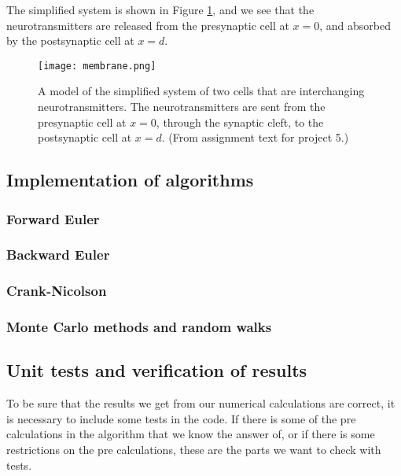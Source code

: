 \documentclass[12pt]{article}
\begin{document}
\begin{flushleft}
The simplified system is shown in Figure \ref{fig:cleft_model}, and we see that the neurotransmitters are released from the presynaptic cell at $x=0$, and absorbed by the postsynaptic cell at $x = d$.

\begin{figure}[!h]
\begin{center}
\texttt{[image: membrane.png]}
\caption{\label{fig:cleft_model}A model of the simplified system of two cells that are interchanging neurotransmitters. The neurotransmitters are sent from the presynaptic cell at $x=0$, through the synaptic cleft, to the postsynaptic cell at $x=d$. (From assignment text for project 5.)}
\end{center}
\end{figure}

\subsection{Implementation of algorithms}
\subsubsection{Forward Euler}
\subsubsection{Backward Euler}
\subsubsection{Crank-Nicolson}
\subsubsection{Monte Carlo methods and random walks}

\subsection{Unit tests and verification of results}
To be sure that the results we get from our numerical calculations are correct, it is necessary to include some tests in the code. If there is some of the pre calculations in the algorithm that we know the answer of, or if there is some restrictions on the pre calculations, these are the parts we want to check with tests.

\end{flushleft}
\end{document}
